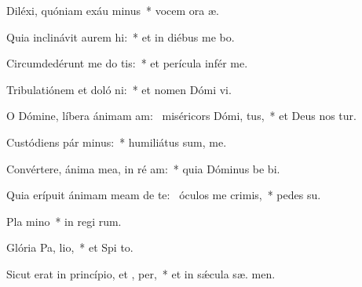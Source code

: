 \item Diléxi, quóniam exáu minus~* vocem ora æ.
\item Quia inclinávit aurem  hi:~* et in diébus me bo.
\item Circumdedérunt me do tis:~* et perícula infér  me.
\item Tribulatiónem et doló ni:~* et nomen Dómi vi.
\item O Dómine, líbera ánimam am:~\pscross{} miséricors Dómi,  tus,~* et Deus nos tur.
\item Custódiens pár minus:~* humiliátus sum,   me.
\item Convértere, ánima mea, in ré am:~* quia Dóminus be bi.
\item Quia erípuit ánimam meam de te:~\pscross{} óculos me  crimis,~* pedes   su.
\item Pla mino~* in regi rum.
\item Glória Pa,  lio,~* et Spi to.
\item Sicut erat in princípio, et ,  per,~* et in sǽcula sæ. men.
